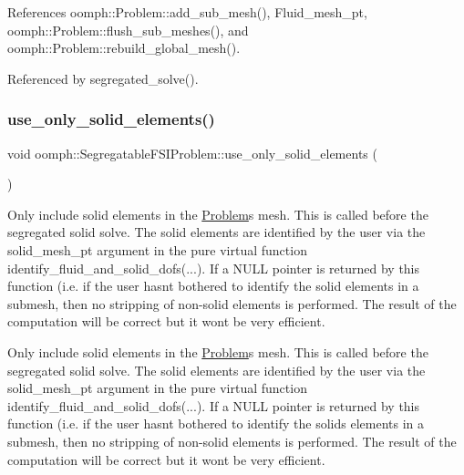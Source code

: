 References oomph\+::\+Problem\+::add\+\_\+sub\+\_\+mesh(), Fluid\+\_\+mesh\+\_\+pt, oomph\+::\+Problem\+::flush\+\_\+sub\+\_\+meshes(), and oomph\+::\+Problem\+::rebuild\+\_\+global\+\_\+mesh().



Referenced by segregated\+\_\+solve().

\mbox{\label{classoomph_1_1SegregatableFSIProblem_a330660bc7b69c9c128bfed62b54dcf62}} 
\subsubsection{\texorpdfstring{use\+\_\+only\+\_\+solid\+\_\+elements()}{use\_only\_solid\_elements()}}
{\footnotesize\ttfamily void oomph\+::\+Segregatable\+F\+S\+I\+Problem\+::use\+\_\+only\+\_\+solid\+\_\+elements (\begin{DoxyParamCaption}{ }\end{DoxyParamCaption})\hspace{0.3cm}{\ttfamily [private]}}



Only include solid elements in the \hyperlink{classoomph_1_1Problem}{Problem}\textquotesingle{}s mesh. This is called before the segregated solid solve. The solid elements are identified by the user via the solid\+\_\+mesh\+\_\+pt argument in the pure virtual function identify\+\_\+fluid\+\_\+and\+\_\+solid\+\_\+dofs(...). If a N\+U\+LL pointer is returned by this function (i.\+e. if the user hasn\textquotesingle{}t bothered to identify the solid elements in a submesh, then no stripping of non-\/solid elements is performed. The result of the computation will be correct but it won\textquotesingle{}t be very efficient. 

Only include solid elements in the \hyperlink{classoomph_1_1Problem}{Problem}\textquotesingle{}s mesh. This is called before the segregated solid solve. The solid elements are identified by the user via the solid\+\_\+mesh\+\_\+pt argument in the pure virtual function identify\+\_\+fluid\+\_\+and\+\_\+solid\+\_\+dofs(...). If a N\+U\+LL pointer is returned by this function (i.\+e. if the user hasn\textquotesingle{}t bothered to identify the solids elements in a submesh, then no stripping of non-\/solid elements is performed. The result of the computation will be correct but it won\textquotesingle{}t be very efficient. 

